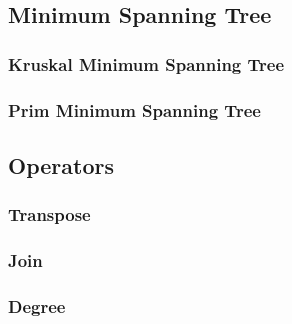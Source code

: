 \subsection{Minimum Spanning Tree}
\subsubsection{Kruskal Minimum Spanning Tree}
\subsubsection{Prim Minimum Spanning Tree}

\subsection{Operators}
\subsubsection{Transpose}
\subsubsection{Join}
\subsubsection{Degree}




